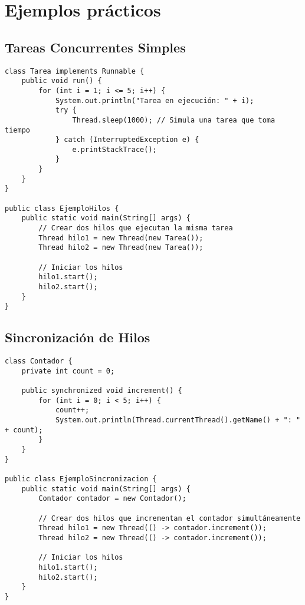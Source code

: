 \documentclass{article}
\begin{document}
\section{Ejemplos prácticos}
\subsection{Tareas Concurrentes Simples}
\begin{verbatim}
class Tarea implements Runnable {
    public void run() {
        for (int i = 1; i <= 5; i++) {
            System.out.println("Tarea en ejecución: " + i);
            try {
                Thread.sleep(1000); // Simula una tarea que toma tiempo
            } catch (InterruptedException e) {
                e.printStackTrace();
            }
        }
    }
}

public class EjemploHilos {
    public static void main(String[] args) {
        // Crear dos hilos que ejecutan la misma tarea
        Thread hilo1 = new Thread(new Tarea());
        Thread hilo2 = new Thread(new Tarea());

        // Iniciar los hilos
        hilo1.start();
        hilo2.start();
    }
}
\end{verbatim}
\subsection{Sincronización de Hilos}
\begin{verbatim}
class Contador {
    private int count = 0;

    public synchronized void increment() {
        for (int i = 0; i < 5; i++) {
            count++;
            System.out.println(Thread.currentThread().getName() + ": " + count);
        }
    }
}

public class EjemploSincronizacion {
    public static void main(String[] args) {
        Contador contador = new Contador();

        // Crear dos hilos que incrementan el contador simultáneamente
        Thread hilo1 = new Thread(() -> contador.increment());
        Thread hilo2 = new Thread(() -> contador.increment());

        // Iniciar los hilos
        hilo1.start();
        hilo2.start();
    }
}
\end{verbatim}
\end{document}
